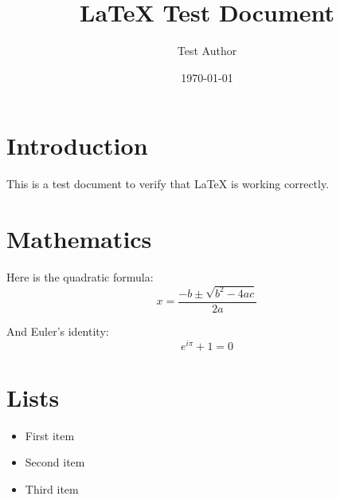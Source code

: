 \documentclass{article}
\title{LaTeX Test Document}
\author{Test Author}
\date{\today}
\begin{document}
\maketitle

\section{Introduction}
This is a test document to verify that \LaTeX{} is working correctly.

\section{Mathematics}
Here is the quadratic formula:
\[
  x = \frac{-b \pm \sqrt{b^2 - 4ac}}{2a}
\]

And Euler's identity:
\[
  e^{i\pi} + 1 = 0
\]

\section{Lists}
\begin{itemize}
  \item First item
  \item Second item
  \item Third item
\end{itemize}
\end{document}
